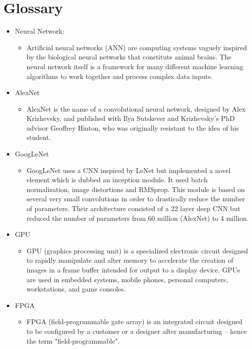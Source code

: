 \documentclass[parskip=full]{scrartcl}
\begin{document}
\section{Glossary}
\begin{itemize}
	\item Neural Network:
	\begin{itemize}
		\item Artificial neural networks (ANN) are computing systems vaguely inspired by the biological neural networks that constitute animal brains. The neural network itself is a framework for many different machine learning algorithms to work together and process complex data inputs.
	\end{itemize}
	
	
	\item AlexNet
	\begin{itemize}
		\item AlexNet is the name of a convolutional neural network, designed by Alex Krizhevsky, and published with Ilya Sutskever and Krizhevsky's PhD advisor Geoffrey Hinton, who was originally resistant to the idea of his student.
	\end{itemize}
	
	
	\item GoogLeNet
	\begin{itemize}
		\item GoogLeNet uses a CNN inspired by LeNet but implemented a novel element which is dubbed an inception module. It used batch normalization, image distortions and RMSprop. This module is based on several very small convolutions in order to drastically reduce the number of parameters. Their architecture consisted of a 22 layer deep CNN but reduced the number of parameters from 60 million (AlexNet) to 4 million.
	\end{itemize}
	
	
	\item GPU
	\begin{itemize}
		\item GPU (graphics processing unit) is a specialized electronic circuit designed to rapidly manipulate and alter memory to accelerate the creation of images in a frame buffer intended for output to a display device. GPUs are used in embedded systems, mobile phones, personal computers, workstations, and game consoles.
	\end{itemize}
	
	
	\item FPGA
	\begin{itemize}
		\item FPGA (field-programmable gate array) is an integrated circuit designed to be configured by a customer or a designer after manufacturing – hence the term "field-programmable".
	\end{itemize}
	

\end{itemize}
\end{document}
